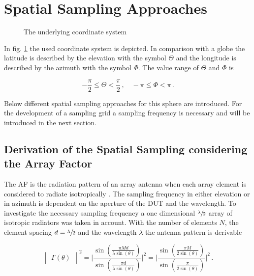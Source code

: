 \section{Spatial Sampling Approaches}
\label{sec:spsa}

\begin{figure}
\centering
\def\svgwidth{0.4\textwidth}

\caption{The underlying coordinate system}
\label{coordinates}
\end{figure}

In fig. \ref{coordinates} the used coordinate system is depicted. In comparison with a globe the latitude is described by the elevation with the symbol $\Theta$ and the longitude is described by the azimuth with the symbol $\Phi$. The value range of $\Theta$ and $\Phi$ is

\begin{equation}
-\frac{\pi}{2} \leq \Theta <\frac{\pi}{2}\, ,\quad -\pi \leq \Phi < \pi\,.
\end{equation}

Below different spatial sampling approaches for this sphere are introduced. For the development of a sampling grid a sampling frequency is necessary and will be introduced in the next section.

\subsection{Derivation of the Spatial Sampling considering the Array Factor}
\label{sec:spasa}

The \ac{AF} is \glqq the radiation pattern of an array antenna when each array element is considered to radiate isotropically\grqq{} \cite{ieeeantenna}. The sampling frequency in either elevation or in azimuth is dependent on the aperture of the \ac{DUT} and the wavelength. To investigate the necessary sampling frequency a one dimensional $\sfrac{\lambda}{2}$ array of isotropic radiators was taken in account. With the number of elements $N$, the element spacing $d = \sfrac{\lambda}{2}$ and the wavelength $\lambda$ the antenna pattern is derivable \cite{litze}

\begin{equation}
\begin{vmatrix}\Gamma\left(\theta\right)\end{vmatrix}^2 = \Biggl|\frac{\sin\left(\frac{\pi M d}{\lambda \sin\left(\theta\right)}\right)}{\sin\left(\frac{\pi d}{\lambda \sin\left(\theta\right)}\right)}\Biggl|^2 = \Biggl|\frac{\sin\left(\frac{\pi M}{2 \sin\left(\theta\right)}\right)}{\sin\left(\frac{\pi}{2 \sin\left(\theta\right)}\right)}\Biggl|^2\,.
\end{equation}

